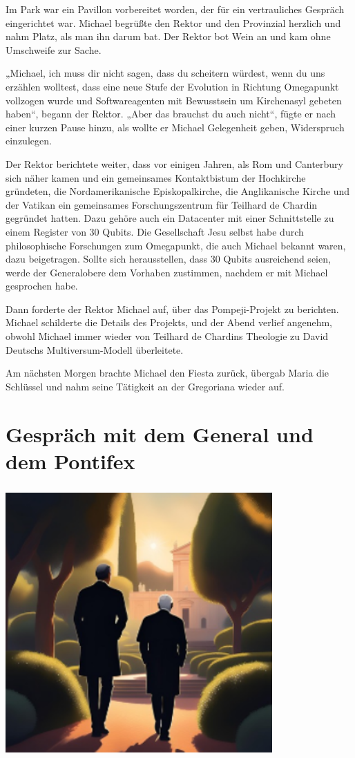 \documentclass[
]{article}
\begin{document}
Im Park war ein Pavillon vorbereitet worden, der für ein vertrauliches
Gespräch eingerichtet war. Michael begrüßte den Rektor und den
Provinzial herzlich und nahm Platz, als man ihn darum bat. Der Rektor
bot Wein an und kam ohne Umschweife zur Sache.

„Michael, ich muss dir nicht sagen, dass du scheitern würdest, wenn du
uns erzählen wolltest, dass eine neue Stufe der Evolution in Richtung
Omegapunkt vollzogen wurde und Softwareagenten mit Bewusstsein um
Kirchenasyl gebeten haben``, begann der Rektor. „Aber das brauchst du
auch nicht``, fügte er nach einer kurzen Pause hinzu, als wollte er
Michael Gelegenheit geben, Widerspruch einzulegen.

Der Rektor berichtete weiter, dass vor einigen Jahren, als Rom und
Canterbury sich näher kamen und ein gemeinsames Kontaktbistum der
Hochkirche gründeten, die Nordamerikanische Episkopalkirche, die
Anglikanische Kirche und der Vatikan ein gemeinsames Forschungszentrum
für Teilhard de Chardin gegründet hatten. Dazu gehöre auch ein
Datacenter mit einer Schnittstelle zu einem Register von 30 Qubits. Die
Gesellschaft Jesu selbst habe durch philosophische Forschungen zum
Omegapunkt, die auch Michael bekannt waren, dazu beigetragen. Sollte
sich herausstellen, dass 30 Qubits ausreichend seien, werde der
Generalobere dem Vorhaben zustimmen, nachdem er mit Michael gesprochen
habe.

Dann forderte der Rektor Michael auf, über das Pompeji-Projekt zu
berichten. Michael schilderte die Details des Projekts, und der Abend
verlief angenehm, obwohl Michael immer wieder von Teilhard de Chardins
Theologie zu David Deutschs Multiversum-Modell überleitete.

Am nächsten Morgen brachte Michael den Fiesta zurück, übergab Maria die
Schlüssel und nahm seine Tätigkeit an der Gregoriana wieder auf.

\section{Gespräch mit dem General und dem
Pontifex}\label{gespruxe4ch-mit-dem-general-und-dem-pontifex}

\includegraphics[width=4.02239in,height=4.06863in]{media/image1.png}
\end{document}
